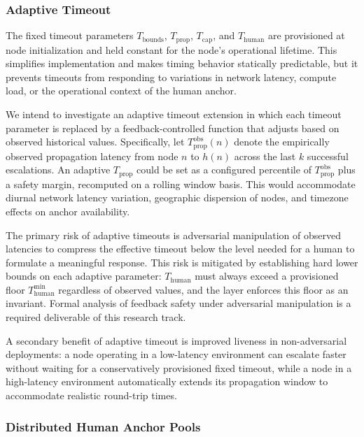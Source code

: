 \subsubsection{Adaptive Timeout}
\label{sec:fw:adaptive-timeout}

The fixed timeout parameters $T_{\text{bounds}}$, $T_{\text{prop}}$, $T_{\text{cap}}$, and $T_{\text{human}}$ are provisioned at node initialization and held constant for the node's operational lifetime. This simplifies implementation and makes timing behavior statically predictable, but it prevents timeouts from responding to variations in network latency, compute load, or the operational context of the human anchor.

We intend to investigate an adaptive timeout extension in which each timeout parameter is replaced by a feedback-controlled function that adjusts based on observed historical values. Specifically, let $T_{\text{prop}}^{\text{obs}}(n)$ denote the empirically observed propagation latency from node $n$ to $h(n)$ across the last $k$ successful escalations. An adaptive $T_{\text{prop}}$ could be set as a configured percentile of $T_{\text{prop}}^{\text{obs}}$ plus a safety margin, recomputed on a rolling window basis. This would accommodate diurnal network latency variation, geographic dispersion of nodes, and timezone effects on anchor availability.

The primary risk of adaptive timeouts is adversarial manipulation of observed latencies to compress the effective timeout below the level needed for a human to formulate a meaningful response. This risk is mitigated by establishing hard lower bounds on each adaptive parameter: $T_{\text{human}}$ must always exceed a provisioned floor $T_{\text{human}}^{\min}$ regardless of observed values, and the \fact{} layer enforces this floor as an invariant. Formal analysis of feedback safety under adversarial manipulation is a required deliverable of this research track.

A secondary benefit of adaptive timeout is improved liveness in non-adversarial deployments: a node operating in a low-latency environment can escalate faster without waiting for a conservatively provisioned fixed timeout, while a node in a high-latency environment automatically extends its propagation window to accommodate realistic round-trip times.

\subsubsection{Distributed Human Anchor Pools}
\label{sec:fw:anchor-pools}

